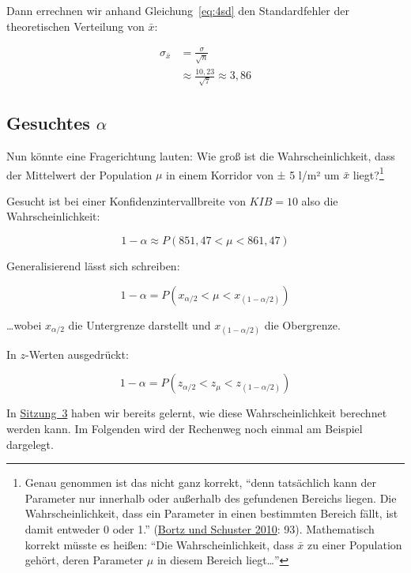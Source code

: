 \documentclass[
  11pt,
  ngerman,
  a4paper,
]{report}
\begin{document}
Dann errechnen wir anhand Gleichung~\eqref{eq:4sd} den Standardfehler der theoretischen Verteilung von \(\bar{x}\):

\nopagebreak

\[\begin{aligned}
\sigma_{\bar{x}}&=\frac{\sigma}{\sqrt{n}}\\[4pt]
           &\approx\frac{10{,}23}{\sqrt{7}}\approx3,86
\end{aligned}\]

\hypertarget{gesuchtes-alpha}{%
\subsection{\texorpdfstring{Gesuchtes \(\alpha\)}{Gesuchtes \textbackslash alpha}}\label{gesuchtes-alpha}}

Nun könnte eine Fragerichtung lauten: Wie groß ist die Wahrscheinlichkeit, dass der Mittelwert der Population \(\mu\) in einem Korridor von ± 5 l/m² um \(\bar{x}\) liegt?\footnote{Genau genommen ist das nicht ganz korrekt, \enquote{denn tatsächlich kann der Parameter nur innerhalb oder außerhalb des gefundenen Bereichs liegen. Die Wahrscheinlichkeit, dass ein Parameter in einen bestimmten Bereich fällt, ist damit entweder 0 oder 1.} (\protect\hyperlink{ref-bortz}{Bortz und Schuster 2010}: 93). Mathematisch korrekt müsste es heißen: \enquote{Die Wahrscheinlichkeit, dass \(\bar{x}\) zu einer Population gehört, deren Parameter \(\mu\) in diesem Bereich liegt\ldots{}}}

Gesucht ist bei einer Konfidenzintervallbreite von \(\textit{KIB}=10\) also die Wahrscheinlichkeit:

\nopagebreak

\[1-\alpha\approx P(851{,}47 < \mu < 861{,}47)\]

Generalisierend lässt sich schreiben:

\nopagebreak

\[
1-\alpha=P(x_{\alpha/2} < \mu < x_{(1-\alpha/2)})
\]

\nopagebreak

\ldots wobei \(x_{\alpha/2}\) die Untergrenze darstellt und \(x_{(1-\alpha/2)}\) die Obergrenze.

In \(z\)-Werten ausgedrückt:

\nopagebreak

\[
1-\alpha=P(z_{\alpha/2} < z_{\mu} < z_{(1-\alpha/2)})
\label{eq:konf}
\]

In \protect\hyperlink{wahrscheinlichkeitsrechnung-mit-standardnormalverteilung}{Sitzung~3} haben wir bereits gelernt, wie diese Wahrscheinlichkeit berechnet werden kann. Im Folgenden wird der Rechenweg noch einmal am Beispiel dargelegt.
\end{document}
